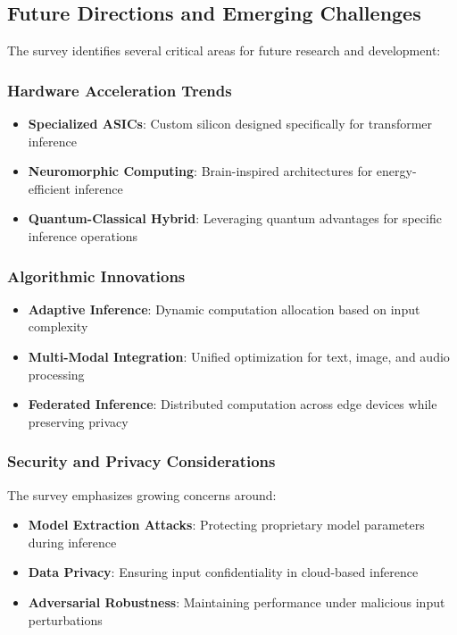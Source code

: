 \documentclass[12pt,a4paper]{article}
\begin{document}
\subsection{Future Directions and Emerging Challenges}

The survey identifies several critical areas for future research and development:

\subsubsection{Hardware Acceleration Trends}

\begin{itemize}
    \item \textbf{Specialized ASICs}: Custom silicon designed specifically for transformer inference
    \item \textbf{Neuromorphic Computing}: Brain-inspired architectures for energy-efficient inference
    \item \textbf{Quantum-Classical Hybrid}: Leveraging quantum advantages for specific inference operations
\end{itemize}

\subsubsection{Algorithmic Innovations}

\begin{itemize}
    \item \textbf{Adaptive Inference}: Dynamic computation allocation based on input complexity
    \item \textbf{Multi-Modal Integration}: Unified optimization for text, image, and audio processing
    \item \textbf{Federated Inference}: Distributed computation across edge devices while preserving privacy
\end{itemize}

\subsubsection{Security and Privacy Considerations}

The survey emphasizes growing concerns around:

\begin{itemize}
    \item \textbf{Model Extraction Attacks}: Protecting proprietary model parameters during inference
    \item \textbf{Data Privacy}: Ensuring input confidentiality in cloud-based inference
    \item \textbf{Adversarial Robustness}: Maintaining performance under malicious input perturbations
\end{itemize}
\end{document}
